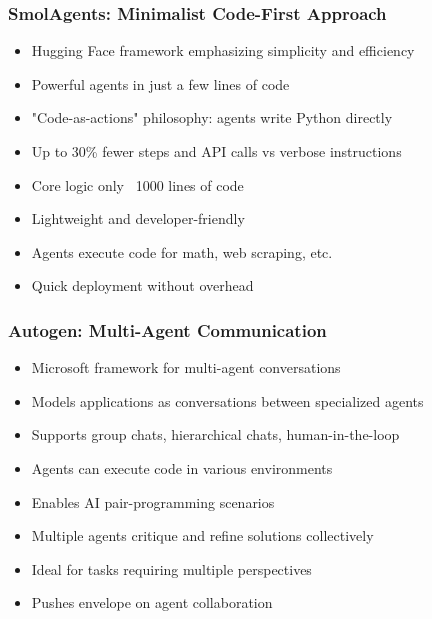 \begin{frame}[fragile]\frametitle{SmolAgents: Minimalist Code-First Approach}
      \begin{itemize}
	  \item Hugging Face framework emphasizing simplicity and efficiency
	  \item Powerful agents in just a few lines of code
	  \item "Code-as-actions" philosophy: agents write Python directly
	  \item Up to 30\% fewer steps and API calls vs verbose instructions
	  \item Core logic only ~1000 lines of code
	  \item Lightweight and developer-friendly
	  \item Agents execute code for math, web scraping, etc.
	  \item Quick deployment without overhead
	  \end{itemize}
\end{frame}

\begin{frame}[fragile]\frametitle{Autogen: Multi-Agent Communication}
      \begin{itemize}
	  \item Microsoft framework for multi-agent conversations
	  \item Models applications as conversations between specialized agents
	  \item Supports group chats, hierarchical chats, human-in-the-loop
	  \item Agents can execute code in various environments
	  \item Enables AI pair-programming scenarios
	  \item Multiple agents critique and refine solutions collectively
	  \item Ideal for tasks requiring multiple perspectives
	  \item Pushes envelope on agent collaboration
	  \end{itemize}
\end{frame}

